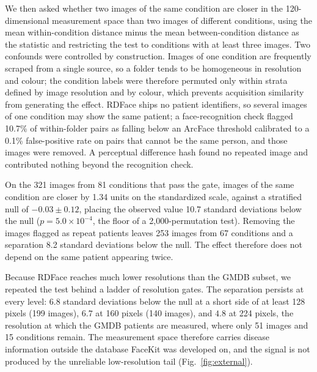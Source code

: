 \documentclass[11pt]{article}
\begin{document}
We then asked whether two images of the same condition are closer in the
120-dimensional measurement space than two images of different conditions,
using the mean within-condition distance minus the mean between-condition
distance as the statistic and restricting the test to conditions with at least
three images. Two confounds were controlled by construction. Images of one
condition are frequently scraped from a single source, so a folder tends to be
homogeneous in resolution and colour; the condition labels were therefore
permuted only within strata defined by image resolution and by colour, which
prevents acquisition similarity from generating the effect. RDFace ships no
patient identifiers, so several images of one condition may show the same
patient; a face-recognition check flagged 10.7\% of within-folder pairs as
falling below an ArcFace threshold calibrated to a 0.1\% false-positive rate on
pairs that cannot be the same person, and those images were removed. A
perceptual difference hash found no repeated image and contributed nothing
beyond the recognition check.

On the 321 images from 81 conditions that pass the gate, images of the same
condition are closer by 1.34 units on the standardized scale, against a
stratified null of $-0.03 \pm 0.12$, placing the observed value 10.7 standard
deviations below the null ($p = 5.0 \times 10^{-4}$, the floor of a
2,000-permutation test). Removing the images flagged as repeat patients leaves
253 images from 67 conditions and a separation 8.2 standard deviations below
the null. The effect therefore does not depend on the same patient appearing
twice.

Because RDFace reaches much lower resolutions than the GMDB subset, we repeated
the test behind a ladder of resolution gates. The separation persists at every
level: $6.8$ standard deviations below the null at a short side of at least 128
pixels (199 images), $6.7$ at 160 pixels (140 images), and $4.8$ at 224 pixels,
the resolution at which the GMDB patients are measured, where only 51 images
and 15 conditions remain. The measurement space therefore carries disease
information outside the database FaceKit was developed on, and the signal is not
produced by the unreliable low-resolution tail
(Fig.~\ref{fig:external}).
\end{document}
